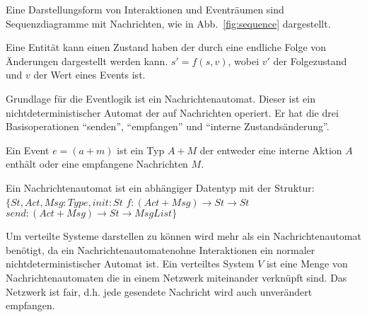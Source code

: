 Eine Darstellungsform von Interaktionen und Eventräumen sind Sequenzdiagramme
mit Nachrichten, wie in Abb.~\ref{fig:sequence} dargestellt.


\begin{defi}
  Eine Entität kann einen Zustand haben der durch eine endliche Folge
  von Änderungen dargestellt werden kann. $s'=f(s,v)$, wobei
  $v'$ der Folgezustand und $v$ der Wert eines Events ist.
\end{defi}



Grundlage für die Eventlogik ist ein Nachrichtenautomat. Dieser ist ein
nichtdeterministischer Automat der auf Nachrichten operiert.
Er hat die drei Basisoperationen ``senden'', ``empfangen'' und ``interne
Zustandsänderung''.~\cite{bickford2003logic}

\begin{defi}
  Ein Event $e=(a+m)$ ist ein Typ $A+M$ der entweder eine interne Aktion $A$ enthält
  oder eine empfangene Nachrichten $M$.
\end{defi}

\begin{defi}
  Ein Nachrichtenautomat ist ein abhängiger Datentyp mit der Struktur:
  $\{St, Act, Msg: Type, init: St$
    $f:(Act+Msg)\rightarrow St\rightarrow St$
    $send:(Act+Msg)\rightarrow St\rightarrow MsgList\}$
\end{defi}

Um verteilte Systeme darstellen zu können wird mehr als ein Nachrichtenautomat
benötigt, da ein Nachrichtenautomatenohne Interaktionen ein normaler
nichtdeterministischer Automat ist. Ein verteiltes System $V$ ist eine Menge von
Nachrichtenautomaten die in einem Netzwerk miteinander verknüpft sind.
Das Netzwerk ist fair, d.h. jede gesendete Nachricht wird auch unverändert
empfangen.~\cite{bickford2003logic}

